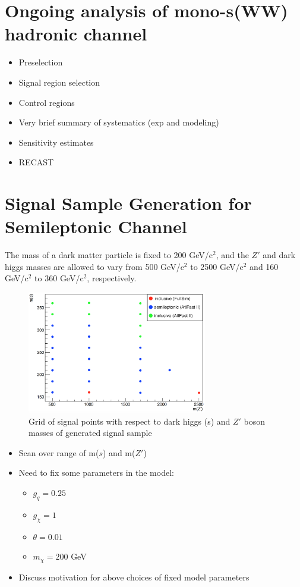 \documentclass[12pt]{article}
\begin{document}
\section{Ongoing analysis of mono-s(WW) hadronic channel}
\begin{itemize}
\item Preselection
\item Signal region selection
\item Control regions
\item Very brief summary of systematics (exp and modeling)
\item Sensitivity estimates
\item RECAST
\end{itemize}

\section{Signal Sample Generation for Semileptonic Channel}

The mass of a dark matter particle is fixed to 200 GeV/c$^2$, and the $Z'$ and dark higgs masses are allowed to vary from 500 GeV/c$^2$ to 2500 GeV/c$^2$ and 160 GeV/c$^2$ to 360 GeV/c$^2$, respectively. 

\begin{figure}[H]
	\centering
	\includegraphics[width=0.7\textwidth]{figures/SignalGrid.png}
	\caption[]{Grid of signal points with respect to dark higgs (s) and $Z'$ boson masses of generated signal sample}
	\label{fig:signalgrid}
\end{figure}

\begin{itemize}
	\item Scan over range of m($s$) and m($Z'$)
	\item Need to fix some parameters in the model:
	\begin{itemize}
		\item $g_{q} = 0.25$
		\item $g_{\chi} = 1$
		\item $\theta = 0.01$
		\item $m_{\chi} = 200$ GeV
	\end{itemize}
	\item Discuss motivation for above choices of fixed model parameters
\end{itemize}
\end{document}
